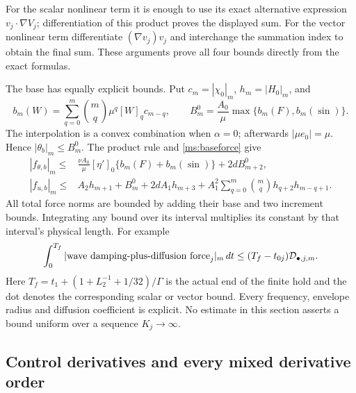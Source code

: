 For the scalar nonlinear term it is enough to use its exact
alternative expression $v_j\cdot\nabla V_j$; differentiation
of this product proves the displayed sum. For the vector nonlinear
term differentiate $(\nabla v_j)v_j$ and interchange the summation
index to obtain the final sum. These arguments prove all four
bounds directly from the exact formulas.

The base has equally explicit bounds. Put
$c_m=|\chi_0|_m$, $h_m=|H_0|_m$, and
\[
 b_m(W)=\sum_{q=0}^m\binom mq\mu^q[W]_q c_{m-q},
 \qquad B_m^0=\frac{A_0}{\mu}\max\{b_m(F),b_m(\sin)\}.
\]
The interpolation is a convex combination when $\alpha=0$;
afterwards $|\mu e_0|=\mu$. Hence $|\theta_b|_m\leq B_m^0$.
The product rule and \eqref{ms:baseforce} give
\begin{align}
 |f_{\theta,b}|_m\leq{}&
       \frac{\nu A_0}{\mu}[\eta']_0\{b_m(F)+b_m(\sin)\}+2dB_{m+2}^0,
 \nonumber\\
 |f_{u,b}|_m\leq{}&A_2h_{m+1}+B_m^0+2dA_1h_{m+3}
       +A_1^2\sum_{q=0}^m\binom mq h_{q+2}h_{m-q+1}.
 \label{ms:basenorm}
\end{align}
All total force norms are bounded by adding their base and two
increment bounds. Integrating any bound over its interval multiplies
its constant by that interval's physical length. For example
\begin{equation}\label{ms:timecost}
 \int_0^{T_f}|\hbox{wave damping-plus-diffusion force}_j|_m\,dt
 \leq (T_f-t_{0j})\mathcal D_{\bullet,j,m}.
\end{equation}
Here $T_f=t_1+(1+L_2^{-1}+1/32)/\Gamma$ is the actual end
of the finite hold and the dot denotes the corresponding scalar or
vector bound. Every frequency, envelope radius and diffusion
coefficient is explicit. No estimate in this section asserts a bound
uniform over a sequence $K_j\to\infty$.

\subsection{Control derivatives and every mixed derivative order}


